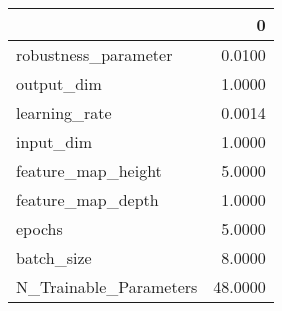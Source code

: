 \begin{tabular}{lr}
\toprule
{} &        0 \\
\midrule
robustness\_parameter   &   0.0100 \\
output\_dim             &   1.0000 \\
learning\_rate          &   0.0014 \\
input\_dim              &   1.0000 \\
feature\_map\_height     &   5.0000 \\
feature\_map\_depth      &   1.0000 \\
epochs                 &   5.0000 \\
batch\_size             &   8.0000 \\
N\_Trainable\_Parameters &  48.0000 \\
\bottomrule
\end{tabular}
